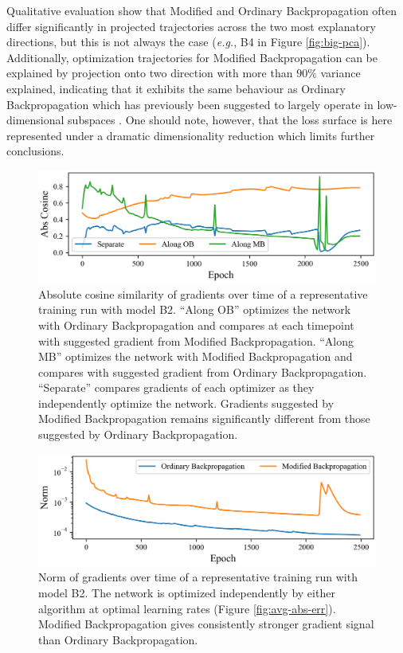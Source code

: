 \documentclass{article}
\theoremstyle{plain}
\theoremstyle{definition}
\theoremstyle{remark}
\begin{document}
Qualitative evaluation show that Modified and Ordinary Backpropagation often differ significantly in projected trajectories across the two most explanatory directions, but this is not always the case (\textit{e.g.}, B4 in Figure \ref{fig:big-pca}). Additionally, optimization trajectories for Modified Backpropagation can be explained by projection onto two direction with more than $90\%$ variance explained, indicating that it exhibits the same behaviour as Ordinary Backpropagation which has previously been suggested to largely operate in low-dimensional subspaces \cite{li-visualizing,song-subspaces}. One should note, however, that the loss surface is here represented under a dramatic dimensionality reduction which limits further conclusions.

\begin{figure}[h]
    \centering
    \includegraphics[width=0.95\columnwidth]{./resources/cos.png}
    \caption{Absolute cosine similarity of gradients over time of a representative training run with model B2. ``Along OB'' optimizes the network with Ordinary Backpropagation and compares at each timepoint with suggested gradient from Modified Backpropagation. ``Along MB'' optimizes the network with Modified Backpropagation and compares with suggested gradient from Ordinary Backpropagation. ``Separate'' compares gradients of each optimizer as they independently optimize the network. Gradients suggested by Modified Backpropagation remains significantly different from those suggested by Ordinary Backpropagation.}
    \label{fig:cos-b2}
\end{figure}

\begin{figure}[h]
    \centering
    \includegraphics[width=0.95\columnwidth]{./resources/norm.png}
    \caption{Norm of gradients over time of a representative training run with model B2. The network is optimized independently by either algorithm at optimal learning rates (Figure \ref{fig:avg-abs-err}). Modified Backpropagation gives consistently stronger gradient signal than Ordinary Backpropagation.}
    \label{fig:norm-b2}
\end{figure}
\end{document}
